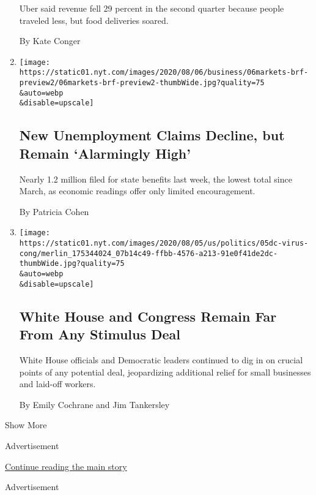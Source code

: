 \begin{enumerate}
  Uber said revenue fell 29 percent in the second quarter because people
  traveled less, but food deliveries soared.

  By Kate Conger
\item
  \href{/2020/08/06/business/economy/unemployment-claims.html}{}

  \texttt{[image: https://static01.nyt.com/images/2020/08/06/business/06markets-brf-preview2/06markets-brf-preview2-thumbWide.jpg?quality=75\\\&auto=webp\\\&disable=upscale]}

  \hypertarget{new-unemployment-claims-decline-but-remain-alarmingly-high}{%
  \subsection{New Unemployment Claims Decline, but Remain `Alarmingly
  High'}\label{new-unemployment-claims-decline-but-remain-alarmingly-high}}

  Nearly 1.2 million filed for state benefits last week, the lowest
  total since March, as economic readings offer only limited
  encouragement.

  By Patricia Cohen
\item
  \href{/2020/08/05/us/politics/congress-coronavirus-stimulus.html}{}

  \texttt{[image: https://static01.nyt.com/images/2020/08/05/us/politics/05dc-virus-cong/merlin\_175344024\_07b14c49-ffbb-4576-a213-91e0f41de2dc-thumbWide.jpg?quality=75\\\&auto=webp\\\&disable=upscale]}

  \hypertarget{white-house-and-congress-remain-far-from-any-stimulus-deal}{%
  \subsection{White House and Congress Remain Far From Any Stimulus
  Deal}\label{white-house-and-congress-remain-far-from-any-stimulus-deal}}

  White House officials and Democratic leaders continued to dig in on
  crucial points of any potential deal, jeopardizing additional relief
  for small businesses and laid-off workers.

  By Emily Cochrane and Jim Tankersley
\end{enumerate}

Show More

Advertisement

\protect\hyperlink{after-mid1}{Continue reading the main story}

Advertisement

